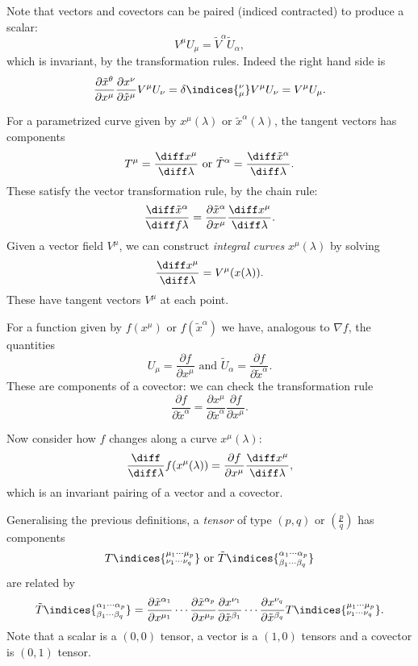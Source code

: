 \documentclass[12pt]{article}
\begin{document}
Note that vectors and covectors can be paired (indiced contracted) to produce a scalar:
\[
	V^\mu U_\mu = \tilde V^\alpha \tilde U_\alpha,
\]
which is invariant, by the transformation rules. Indeed the right hand side is
\[
	\frac{\partial \tilde x^\theta}{\partial x^\mu} \frac{\partial x^\nu}{\partial \tilde x^\mu} V^\mu U_\nu = \delta\indices{_\mu^\nu} V^\mu U_\nu = V^\mu U_\mu.
\]

\begin{exbox}
	For a parametrized curve given by $x^\mu(\lambda)$ or $\tilde x^\alpha(\lambda)$, the tangent vectors has components
	\[
		T^\mu = \frac{\diff x^\mu}{\diff \lambda} \text{ or } \tilde T^\alpha = \frac{\diff \tilde x^\alpha}{\diff \lambda}.
	\]
	These satisfy the vector transformation rule, by the chain rule:
	\[
	\frac{\diff \tilde x^\alpha}{\diff f\lambda} = \frac{\partial \tilde x^\alpha}{\partial x^\mu} \frac{\diff x^\mu}{\diff \lambda}.
	\]
	Given a vector field $V^\mu$, we can construct \emph{integral curves} $x^\mu(\lambda)$ by solving
	\[
	\frac{\diff x^\mu}{\diff \lambda} = V^\mu(x(\lambda)).
	\]
	These have tangent vectors $V^\mu$ at each point.

	For a function given by $f(x^\mu)$ or $f(\tilde x^\alpha)$ we have, analogous to $\nabla f$, the quantities
	\[
		U_\mu = \frac{\partial f}{\partial x^\mu} \text{ and } \tilde U_\alpha = \frac{\partial f}{\partial \tilde x^\alpha}.
	\]
	These are components of a covector: we can check the transformation rule
	\[
	\frac{\partial f}{\partial \tilde x^\alpha} = \frac{\partial x^\mu}{\partial \tilde x^\alpha} \frac{\partial f}{\partial x^\mu}.
	\]

	Now consider how $f$ changes along a curve $x^\mu(\lambda)$:
	\[
	\frac{\diff}{\diff \lambda} f(x^\mu(\lambda)) = \frac{\partial f}{\partial x^\mu} \frac{\diff x^\mu}{\diff \lambda},
	\]
	which is an invariant pairing of a vector and a covector.
\end{exbox}

Generalising the previous definitions, a \emph{tensor} of type $(p, q)$ or $\left( \frac{p}{q} \right)$ has components
\[
	T\indices{^{\mu_1\cdots\mu_p}_{\nu_1\cdots\nu_q}} \text{ or } \tilde T\indices{^{\alpha_1\cdots\alpha_p}_{\beta_1\cdots\beta_q}}
\]
are related by
\[
	\tilde T\indices{^{\alpha_1\cdots\alpha_p}_{\beta_1\cdots\beta_q}} = \frac{\partial \tilde x^{\alpha_1}}{\partial x^{\mu_1}} \cdots \frac{\partial \tilde x^{\alpha_p}}{\partial x^{\mu_p}} \frac{\partial x^{\nu_1}}{\partial \tilde x^{\beta_1}} \cdots \frac{\partial x^{\nu_q}}{\partial \tilde x^{\beta_q}} T\indices{^{\mu_1\cdots\mu_p}_{\nu_1\cdots\nu_q}}.
\]
Note that a scalar is a $(0, 0)$ tensor, a vector is a $(1, 0)$ tensors and a covector is $(0, 1)$ tensor.
\end{document}
